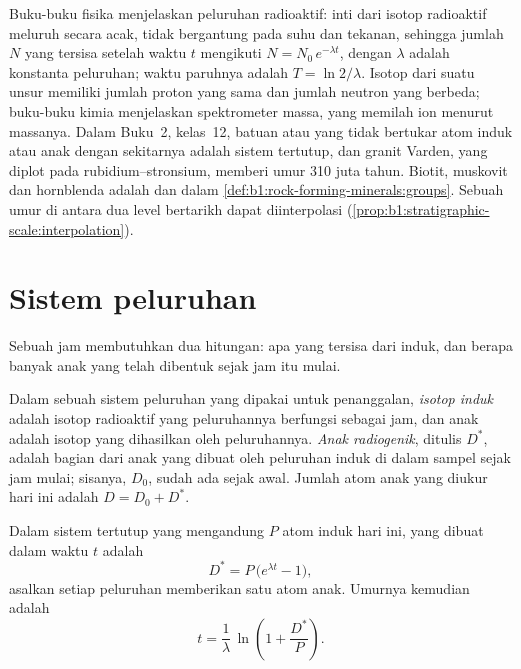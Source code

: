 \begin{recall}
Buku-buku fisika menjelaskan peluruhan radioaktif: inti dari isotop radioaktif meluruh secara acak, tidak bergantung pada suhu dan tekanan, sehingga jumlah $N$ yang tersisa setelah waktu $t$ mengikuti $N = N_0\,e^{-\lambda t}$, dengan $\lambda$ adalah konstanta peluruhan; waktu paruhnya adalah $T = \ln 2/\lambda$. Isotop dari suatu unsur memiliki jumlah proton yang sama dan jumlah neutron yang berbeda; buku-buku kimia menjelaskan spektrometer massa, yang memilah ion menurut massanya. Dalam Buku~2, kelas~12, batuan atau  yang tidak bertukar atom induk atau anak dengan sekitarnya adalah sistem tertutup, dan  granit Varden, yang diplot pada  rubidium--stronsium, memberi umur 310 juta tahun. Biotit, muskovit dan hornblenda adalah  dan  dalam \cref{def:b1:rock-forming-minerals:groups}. Sebuah umur di antara dua level bertarikh dapat diinterpolasi (\cref{prop:b1:stratigraphic-scale:interpolation}).
\end{recall}

\section{Sistem peluruhan}\label{sec:b1:radiometric-methods:systems}

Sebuah jam membutuhkan dua hitungan: apa yang tersisa dari induk, dan berapa banyak anak yang telah dibentuk sejak jam itu mulai.

\begin{definition}\label{def:b1:radiometric-methods:radiogenic}
Dalam sebuah sistem peluruhan yang dipakai untuk penanggalan, \emph{isotop induk} adalah isotop radioaktif yang peluruhannya berfungsi sebagai jam, dan anak adalah isotop yang dihasilkan oleh peluruhannya. \emph{Anak radiogenik}, ditulis $D^*$, adalah bagian dari anak yang dibuat oleh peluruhan induk di dalam sampel sejak jam mulai; sisanya, $D_0$, sudah ada sejak awal. Jumlah atom anak yang diukur hari ini adalah $D = D_0 + D^*$.
\end{definition}

\begin{proposition}\label{prop:b1:radiometric-methods:growth}
Dalam sistem tertutup yang mengandung $P$ atom induk hari ini,  yang dibuat dalam waktu $t$ adalah
\[
  D^* = P\,\bigl(e^{\lambda t} - 1\bigr),
\]
asalkan setiap peluruhan memberikan satu atom anak. Umurnya kemudian adalah
\[
  t = \frac{1}{\lambda}\,\ln\!\left(1 + \frac{D^*}{P}\right).
\]
\end{proposition}

